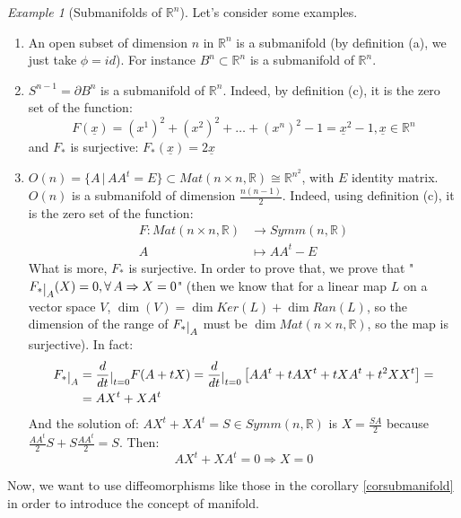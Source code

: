\documentclass[a4paper,11pt,titlepage]{article}
\numberwithin{equation}{section}
\theoremstyle{definition}
\theoremstyle{remark}
\newtheorem{example}[theorem]{Example}
\newcommand{\rfield}{\mathbb{R}}
\newcommand{\restrict}[2]{{#1}\raisebox{-.5ex}{$|$}_{#2}}
\begin{document}
\begin{example}[Submanifolds of $\rfield^n$]
  Let's consider some examples.
  \begin{enumerate}
    \item An open subset of dimension $n$ in $\rfield^n$ is a submanifold (by definition (a), we just take $\phi = id$). For instance $B^n\subset \rfield^n$ is a submanifold of $\rfield^n$.
    \item $S^{n-1} = \partial B^n$ is a submanifold of $\rfield^n$. Indeed, by definition (c), it is the zero set of the function:
    $$F(\underline{x}) = (x^1)^2 + (x^2)^2 + \ldots + (x^n)^2 - 1 = \underline{x}^2 -1, \underline{x} \in \rfield^n$$
    and $F_*$ is surjective: $F_*(\underline{x}) = 2 \underline{x}$
    \item $O(n) = \{A \, | \, AA^t = E\} \subset Mat(n \times n, \rfield) \cong \rfield^{n^2}$, with $E$ identity matrix. $O(n)$ is a submanifold of dimension $\frac{n(n-1)}{2}$. Indeed, using definition (c), it is the zero set of the function:
    \begin{align*}
      F \colon Mat(n \times n, \rfield) &\rightarrow Symm(n, \rfield) \\
      A &\mapsto AA^t - E
    \end{align*}
    What is more, $F_*$ is surjective. In order to prove that, we prove that "$\restrict{F_*}{A}(X)=0, \forall\, A \Rightarrow X = 0$" (then we know that for a linear map $L$ on a vector space $V$, $\dim(V) = \dim Ker(L) + \dim Ran(L)$, so the dimension of the range of $\restrict{F_*}{A}$ must be $\dim Mat(n\times n, \rfield)$, so the map is surjective).
    In fact:
    \begin{align*}
    \restrict{F_*}{A} &= \restrict{\frac{d}{dt}}{t=0}F(A + tX) = \restrict{\frac{d}{dt}}{t=0} \left[ AA^t + tAX^t + tXA^t + t^2XX^t \right] = \\
    & = AX^t + XA^t
  \end{align*}
    And the solution of:
    $AX^t + XA^t = S \in Symm(n, \rfield)$
    is $X = \frac{SA}{2}$ because $\frac{AA^t}{2}S + S\frac{AA^t}{2} = S$.
    Then:
    $$AX^t + XA^t = 0 \Longrightarrow X=0$$
  \end{enumerate}
\end{example}

Now, we want to use diffeomorphisms like those in the corollary \ref{corsubmanifold} in order to introduce the concept of manifold.
\end{document}
